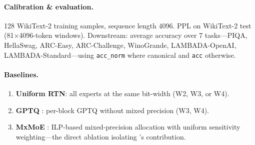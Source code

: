 \paragraph{Calibration \& evaluation.} 128 WikiText-2 training samples, sequence length 4096. PPL on WikiText-2 test (81$\times$4096-token windows). Downstream: average accuracy over 7 tasks---PIQA, HellaSwag, ARC-Easy, ARC-Challenge, WinoGrande, LAMBADA-OpenAI, LAMBADA-Standard---using \texttt{acc\_norm} where canonical and \texttt{acc} otherwise.

\paragraph{Baselines.}
\begin{enumerate}
\item \textbf{Uniform RTN}: all experts at the same bit-width (W2, W3, or W4).
\item \textbf{GPTQ} \citep{frantar2023gptq}: per-block GPTQ without mixed precision (W3, W4).
\item \textbf{MxMoE} \citep{duanmu2025mxmoe}: ILP-based mixed-precision allocation with uniform sensitivity weighting---the direct ablation isolating \method's contribution.
\end{enumerate}
